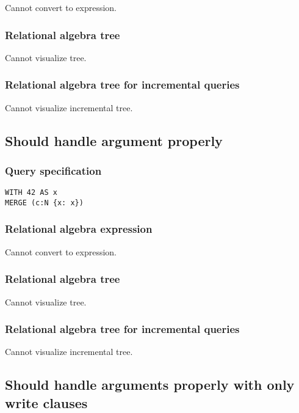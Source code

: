 Cannot convert to expression.

\subsubsection*{Relational algebra tree}

Cannot visualize tree.

\subsubsection*{Relational algebra tree for incremental queries}

Cannot visualize incremental tree.

\subsection{Should handle argument properly}

\subsubsection*{Query specification}

\begin{lstlisting}
WITH 42 AS x
MERGE (c:N {x: x})
\end{lstlisting}

\subsubsection*{Relational algebra expression}

Cannot convert to expression.

\subsubsection*{Relational algebra tree}

Cannot visualize tree.

\subsubsection*{Relational algebra tree for incremental queries}

Cannot visualize incremental tree.

\subsection{Should handle arguments properly with only write clauses}

